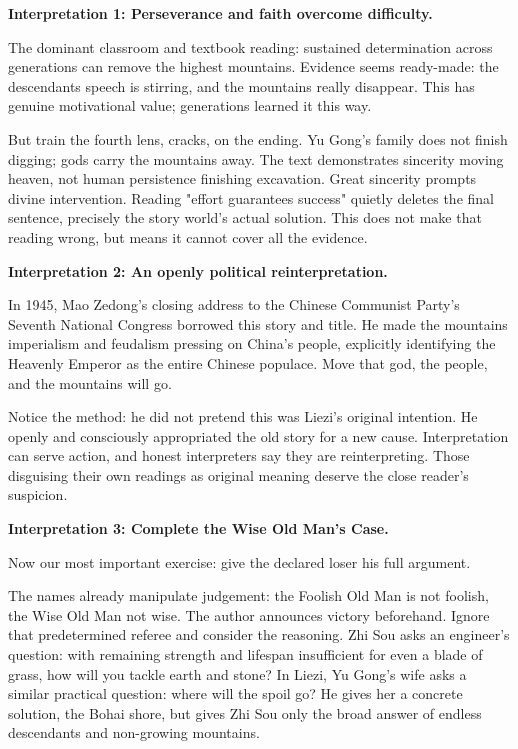 \textbf{Interpretation 1: Perseverance and faith overcome difficulty.}

The dominant classroom and textbook reading: sustained determination across generations can remove the highest mountains. Evidence seems ready-made: the descendants speech is stirring, and the mountains really disappear. This has genuine motivational value; generations learned it this way.

But train the fourth lens, cracks, on the ending. Yu Gong's family does not finish digging; gods carry the mountains away. The text demonstrates sincerity moving heaven, not human persistence finishing excavation. Great sincerity prompts divine intervention. Reading "effort guarantees success" quietly deletes the final sentence, precisely the story world's actual solution. This does not make that reading wrong, but means it cannot cover all the evidence.

\textbf{Interpretation 2: An openly political reinterpretation.}

In 1945, Mao Zedong's closing address to the Chinese Communist Party's Seventh National Congress borrowed this story and title. He made the mountains imperialism and feudalism pressing on China's people, explicitly identifying the Heavenly Emperor as the entire Chinese populace. Move that god, the people, and the mountains will go.

Notice the method: he did not pretend this was Liezi's original intention. He openly and consciously appropriated the old story for a new cause. Interpretation can serve action, and honest interpreters say they are reinterpreting. Those disguising their own readings as original meaning deserve the close reader's suspicion.

\textbf{Interpretation 3: Complete the Wise Old Man's Case.}

Now our most important exercise: give the declared loser his full argument.

The names already manipulate judgement: the Foolish Old Man is not foolish, the Wise Old Man not wise. The author announces victory beforehand. Ignore that predetermined referee and consider the reasoning. Zhi Sou asks an engineer's question: with remaining strength and lifespan insufficient for even a blade of grass, how will you tackle earth and stone? In Liezi, Yu Gong's wife asks a similar practical question: where will the spoil go? He gives her a concrete solution, the Bohai shore, but gives Zhi Sou only the broad answer of endless descendants and non-growing mountains.

